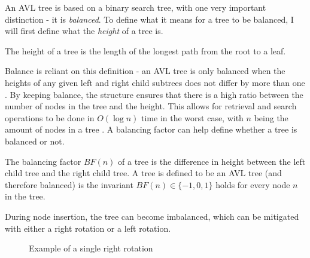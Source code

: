 An AVL tree is based on a binary search tree, with one very important distinction - it is \textit{balanced}. To define what it means for a tree to be balanced, I will first
define what the \textit{height} of a tree is.

\begin{definition}
  \label{def:height}
  The height of a tree is the length of the longest path from the root to a leaf.
\end{definition} 
 
Balance is reliant on this definition - an AVL tree is only balanced when the 
heights of any given left and right child subtrees does not differ by more than one \cite{avl:original}. By keeping balance, the structure ensures that there is a high ratio between the number of 
nodes in the tree and the height. This allows for retrieval and search operations to be done in $O(\log n)$ time in the worst case, with $n$ being the amount of nodes in a tree \cite{avl:computer}. A
balancing factor can help define whether a tree is balanced or not.

\begin{definition}
  \label{def:bf}
  The balancing factor $BF(n)$ of a tree is the difference in height between the left child tree and the right child tree. A tree is defined to be an AVL tree (and therefore balanced) is the
  invariant $BF(n) \in \{-1,0,1\}$ holds for every node $n$ in the tree.
\end{definition}

During node insertion, the tree can become imbalanced, which can be mitigated
with either a right rotation or a left rotation. 

\begin{figure}[!ht]
  \centering
  \hspace{1cm}%
  \caption{Example of a single right rotation}
  \label{fig:right_rotation}
\end{figure}